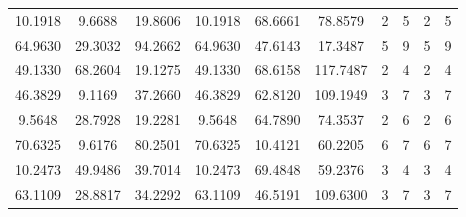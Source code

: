 \documentclass[withoutpreface,bwprint]{cumcmthesis}
\begin{document}
\begin{appendices}
\begin{table}[htbp!]
\begin{tabular}{@{}cccccccccc@{}}
				10.1918                          & 9.6688                           & 19.8606                          & 10.1918                          & 68.6661                          & 78.8579                          & 2                    & 5                    & 2                      & 5                      \\
				64.9630                          & 29.3032                          & 94.2662                          & 64.9630                          & 47.6143                          & 17.3487                          & 5                    & 9                    & 5                      & 9                      \\
				49.1330                          & 68.2604                          & 19.1275                          & 49.1330                          & 68.6158                          & 117.7487                         & 2                    & 4                    & 2                      & 4                      \\
				46.3829                          & 9.1169                           & 37.2660                          & 46.3829                          & 62.8120                          & 109.1949                         & 3                    & 7                    & 3                      & 7                      \\
				9.5648                           & 28.7928                          & 19.2281                          & 9.5648                           & 64.7890                          & 74.3537                          & 2                    & 6                    & 2                      & 6                      \\
				70.6325                          & 9.6176                           & 80.2501                          & 70.6325                          & 10.4121                          & 60.2205                          & 6                    & 7                    & 6                      & 7                      \\
				10.2473                          & 49.9486                          & 39.7014                          & 10.2473                          & 69.4848                          & 59.2376                          & 3                    & 4                    & 3                      & 4                      \\
				63.1109                          & 28.8817                          & 34.2292                          & 63.1109                          & 46.5191                          & 109.6300                         & 3                    & 7                    & 3                      & 7                      \\

\end{tabular}
\end{table}
\end{appendices}
\end{document}
